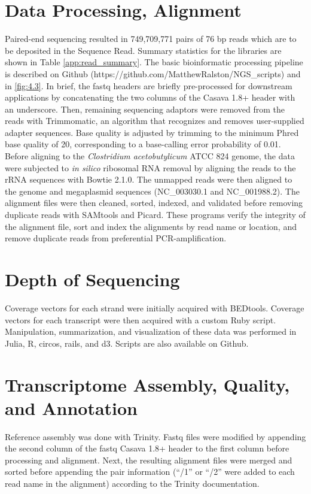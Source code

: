 \section{Data Processing, Alignment}\label{methods:read_process_align}
Paired-end sequencing resulted in 749,709,771 pairs of 76 bp reads which are to be deposited in the Sequence Read. Summary statistics for the libraries are shown in Table \ref{app:read_summary}. The basic bioinformatic processing pipeline is described on Github (https://github.com/MatthewRalston/NGS_scripts) and in \ref{fig:4.3}. In brief, the fastq headers are briefly pre-processed for downstream applications by concatenating the two columns of the Casava 1.8+ header with an underscore. Then, remaining sequencing adaptors were removed from the reads with Trimmomatic\cite{47}, an algorithm that recognizes and removes user-supplied adapter sequences. Base quality is adjusted by trimming to the minimum Phred base quality of 20, corresponding to a base-calling error probability of 0.01. Before aligning to the \textit{Clostridium acetobutylicum} ATCC 824 genome, the data were subjected to \textit{in silico} ribosomal RNA removal by aligning the reads to the rRNA sequences with Bowtie 2.1.0\cite{17}. The unmapped reads were then aligned to the genome and megaplasmid sequences (NC_003030.1 and NC_001988.2). The alignment files were then cleaned, sorted, indexed, and validated before removing duplicate reads with SAMtools\cite{19} and Picard\cite{40}. These programs verify the integrity of the alignment file, sort and index the alignments by read name or location, and remove duplicate reads from preferential PCR-amplification.

\section{Depth of Sequencing}
Coverage vectors for each strand were initially acquired with BEDtools\cite{49}. Coverage vectors for each transcript were then acquired with a custom Ruby script. Manipulation, summarization, and visualization of these data was performed in Julia, R\cite{59}, circos, rails, and d3. Scripts are also available on Github. 

\section{Transcriptome Assembly, Quality, and Annotation}
Reference assembly was done with Trinity\cite{58}. Fastq files were modified by appending the second column of the fastq Casava 1.8+ header to the first column before processing and alignment. Next, the resulting alignment files were merged and sorted before appending the pair information (``/1'' or ``/2'' were added to each read name in the alignment) according to the Trinity documentation.

